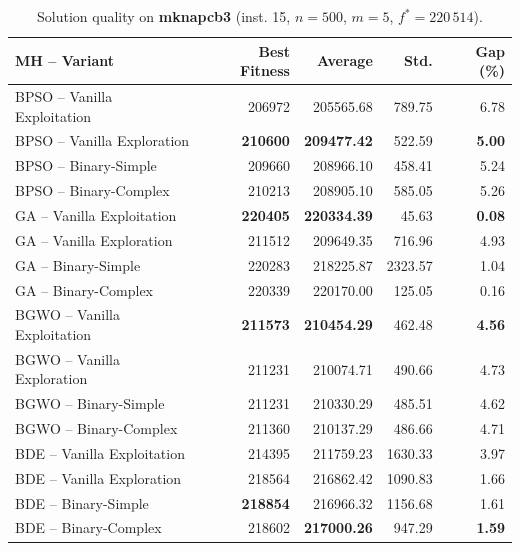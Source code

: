 \begin{table}[htbp]
  \centering
  \small
  \caption{Solution quality on \textbf{mknapcb3} (inst. 15, $n=500$, $m=5$, $f^*=220\,514$).}
  \label{tab:calidad_mknapcb3_15}
  \begin{tabular}{lrrrr}
    \toprule
    \textbf{MH -- Variant} &
    \textbf{Best Fitness} &
    \textbf{Average} &
    \textbf{Std.} &
    \textbf{Gap (\%)} \\
    \midrule
    BPSO -- Vanilla Exploitation &         206972 &        205565.68 & 789.75 &         6.78 \\
    BPSO -- Vanilla Exploration  & \textbf{210600} & \textbf{209477.42} & 522.59 & \textbf{5.00} \\
    BPSO -- Binary-Simple        &         209660 &        208966.10 & 458.41 &         5.24 \\
    BPSO -- Binary-Complex       &         210213 &        208905.10 & 585.05 &         5.26 \\
    \midrule
    GA -- Vanilla Exploitation   & \textbf{220405} & \textbf{220334.39} &  45.63 & \textbf{0.08} \\
    GA -- Vanilla Exploration    &         211512 &        209649.35 & 716.96 &         4.93 \\
    GA -- Binary-Simple          &         220283 &        218225.87 & 2323.57 &         1.04 \\
    GA -- Binary-Complex         &         220339 &        220170.00 & 125.05 &         0.16 \\
    \midrule
    BGWO -- Vanilla Exploitation & \textbf{211573} & \textbf{210454.29} & 462.48 & \textbf{4.56} \\
    BGWO -- Vanilla Exploration  &         211231 &        210074.71 & 490.66 &         4.73 \\
    BGWO -- Binary-Simple        &         211231 &        210330.29 & 485.51 &         4.62 \\
    BGWO -- Binary-Complex       &         211360 &        210137.29 & 486.66 &         4.71 \\
    \midrule
    BDE -- Vanilla Exploitation  &         214395 &        211759.23 & 1630.33 &         3.97 \\
    BDE -- Vanilla Exploration   &         218564 &        216862.42 & 1090.83 &         1.66 \\
    BDE -- Binary-Simple         & \textbf{218854} &        216966.32 & 1156.68 &         1.61 \\
    BDE -- Binary-Complex        &         218602 & \textbf{217000.26} & 947.29 & \textbf{1.59} \\
    \bottomrule
  \end{tabular}
\end{table}
